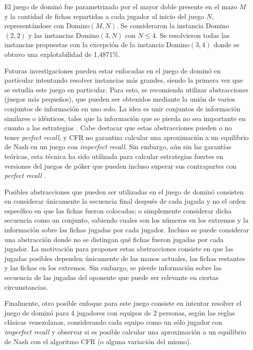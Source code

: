 El juego de dominó fue parametrizado por el mayor doble presente en el mazo $M$ y la cantidad de fichas repartidas a cada jugador al inicio del juego $N$, representándose con Domino$(M, N)$. Se consideraron la instancia Domino$(2, 2)$ y las instancias Domino$(3, N)$ con $N \leq 4$. Se resolvieron todas las instancias propuestas con la excepción de la instancia Domino$(3, 4)$ donde se obtuvo una explotabilidad de 1,4871\%.

Futuras investigaciones pueden estar enfocadas en el juego de dominó en particular intentando resolver instancias más grandes, siendo la primera vez que se estudia este juego en particular. Para esto, se recomienda utilizar abstracciones (juegos más pequeños), que pueden ser obtenidos mediante la unión de varios conjuntos de información en uno solo. La idea es unir conjuntos de información similares o idénticos, tales que la información que se pierda no sea importante en cuanto a las estrategias \cite[pp.~71-72]{bib:thesis-marc-lanctot}. Cabe destacar que estas abstracciones pueden o no tener \textit{perfect recall}, y CFR no garantiza calcular una aproximación a un equilibrio de Nash en un juego con \textit{imperfect recall}. Sin embargo, aún sin las garantías teóricas, esta técnica ha sido utilizada para calcular estrategias fuertes en versiones del juegos de póker que pueden incluso superar sus contrapartes con \textit{perfect recall} \cite{bib:imperfect-recall}.

Posibles abstracciones que pueden ser utilizadas en el juego de dominó consisten en considerar únicamente la secuencia final después de cada jugada y no el orden específico en que las fichas fueron colocadas; o simplemente considerar dicha secuencia como un conjunto, sabiendo cuales son los números en los extremos y la información sobre las fichas jugadas por cada jugador. Incluso se puede considerar una abstracción donde no se distingan qué fichas fueron jugadas por cada jugador. La motivación para proponer estas abstracciones consiste en que las jugadas posibles dependen únicamente de las manos actuales, las fichas restantes y las fichas en los extremos. Sin embargo, se pierde información sobre las secuencia de las jugadas del oponente que puede ser relevante en ciertas circunstancias.

Finalmente, otro posible enfoque para este juego consiste en intentar resolver el juego de dominó para 4 jugadores con equipos de 2 personas, según las reglas clásicas venezolanas, considerando cada equipo como un sólo jugador con \textit{imperfect recall} y observar si es posible calcular una aproximación a un equilibrio de Nash con el algoritmo CFR (o alguna variación del mismo).
